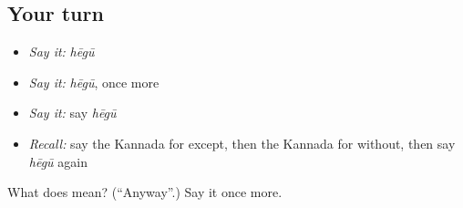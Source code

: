 \subsection*{Your turn}
\begin{itemize}
\raggedright
  \item \emph{Say it:} \emph{hēgū}
  \item \emph{Say it:} \emph{hēgū}, once more
  \item \emph{Say it:} say \emph{hēgū}
  \item \emph{Recall:} say the Kannada for except, then the Kannada for without, then say \emph{hēgū} again
\end{itemize}

\begin{tcolorbox}[breakable,colback=teal!4,colframe=teal!35!black,title={Before you move on}]
What does  mean? (\textquotedblleft{}Anyway\textquotedblright{}.) Say it once more.
\end{tcolorbox}
